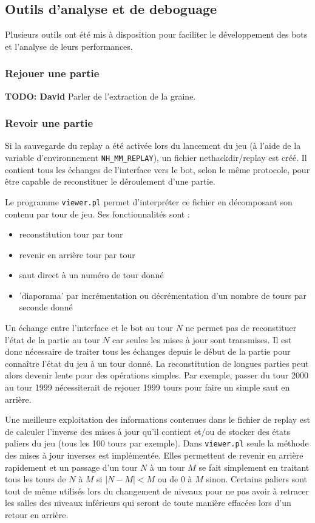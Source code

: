 \documentclass[a4paper,12pt]{article}
\begin{document}
\subsection{Outils d'analyse et de deboguage}

Plusieurs outils ont été mis à disposition pour faciliter le développement des
bots et l'analyse de leurs performances.

\subsubsection{Rejouer une partie}

\textbf{TODO: David} Parler de l'extraction de la graine.

\subsubsection{Revoir une partie}

Si la sauvegarde du replay a été activée lors du lancement du jeu (à l'aide de
la variable d'environnement \verb!NH_MM_REPLAY!), un fichier nethackdir/replay
est créé. Il contient tous les échanges de l'interface vers le bot, selon le
même protocole, pour être capable de reconstituer le déroulement d'une partie.

Le programme \verb!viewer.pl! permet d'interpréter ce fichier en décomposant
son contenu par tour de jeu. Ses fonctionnalités sont :
\begin{itemize}
	\item reconstitution tour par tour
	\item revenir en arrière tour par tour
	\item saut direct à un numéro de tour donné
	\item 'diaporama' par incrémentation ou décrémentation d'un nombre de
		tours par seconde donné
\end{itemize}

Un échange entre l'interface et le bot au tour $N$ ne permet pas de
reconstituer l'état de la partie au tour $N$ car seules les mises à jour sont
transmises. Il est donc nécessaire de traiter tous les échanges depuis le
début de la partie pour connaître l'état du jeu à un tour donné. La
reconstitution de longues parties peut alors devenir lente pour des opérations
simples. Par exemple, passer du tour 2000 au tour 1999 nécessiterait de
rejouer 1999 tours pour faire un simple saut en arrière.

Une meilleure exploitation des informations contenues dans le fichier de
replay est de calculer l'inverse des mises à jour qu'il contient et/ou de
stocker des états paliers du jeu (tous les 100 tours par exemple). Dans
\verb!viewer.pl! seule la méthode des mises à jour inverses est implémentée.
Elles permettent de revenir en arrière rapidement et un passage d'un tour $N$
à un tour $M$ se fait simplement en traitant tous les tours de $N$ à $M$ si
$|N-M| < M$ ou de $0$ à $M$ sinon. Certains paliers sont tout de même utilisés
lors du changement de niveaux pour ne pas avoir à retracer les salles des
niveaux inférieurs qui seront de toute manière effacées lors d'un retour en
arrière.
\end{document}
